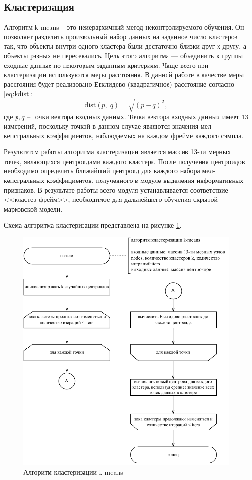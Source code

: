 \subsection{Кластеризация}

Алгоритм k-means -- это неиерархичный метод неконтролируемого обучения. Он позволяет разделить произвольный набор данных на заданное число кластеров так, что объекты внутри одного кластера были достаточно
близки друг к другу, а объекты разных не пересекались. Цель этого алгоритма — объединить в группы сходные данные по некоторым заданным критериям. Чаще всего при кластеризации используются меры расстояния. В данной работе в качестве меры расстояния будет реализовано Евклидово (квадратичное) расстояние согласно \ref{eq:kdist}:
\begin{equation}\label{eq:kdist}
	\mathrm{dist}(p,\;q) = \sqrt{(p - q)^2},
\end{equation}
где $p, q$ -- точки вектора входных данных. Точка вектора входных данных имеет 13 измерений, поскольку точкой в данном случае являются значения мел-кепстральных коэффициентов, наблюдаемых на каждом фрейме каждого сэмпла.

Результатом работы алгоритма кластеризации является массив 13-ти мерных точек, являющихся центроидами каждого кластера. После получения центроидов необходимо определить ближайший центроид для каждого набора мел-кепстральных коэффициентов, полученного в модуле выделения информативных признаков. В результате работы всего модуля устанавливается соответствие <<кластер-фрейм>>, необходимое для дальнейшего обучения скрытой марковской модели.

Схема алгоритма кластеризации представлена на рисунке \ref{fig:kmeans}.
\begin{figure}[H]
	\centering
	\includegraphics[width=0.7\linewidth]{assets/kmeans-flowchart}
	\caption{Алгоритм кластеризации k-means}
	\label{fig:kmeans}
\end{figure}

